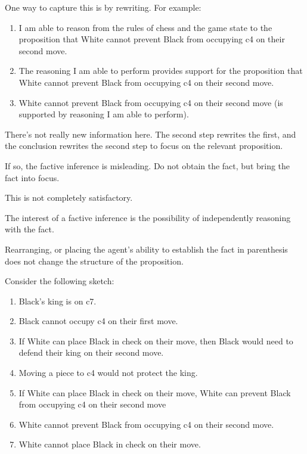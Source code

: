 \documentclass[10pt]{article}
\begin{document}
One way to capture this is by rewriting.
For example:

\begin{enumerate}
\item\label{potential:claim} I am able to reason from the rules of chess and the game state to the proposition that White cannot prevent Black from occupying c4 on their second move.
\item\label{potential:necessity} The reasoning I am able to perform provides support for the proposition that White cannot prevent Black from occupying c4 on their second move.
\item\label{potential:focus} White cannot prevent Black from occupying c4 on their second move (is supported by reasoning I am able to perform).
\end{enumerate}

There's not really new information here.
The second step rewrites the first, and the conclusion rewrites the second step to focus on the relevant proposition.

If so, the factive inference is misleading.
Do not obtain the fact, but bring the fact into focus.

This is not completely satisfactory.

The interest of a factive inference is the possibility of independently reasoning with the fact.

Rearranging, or placing the agent's ability to establish the fact in parenthesis does not change the structure of the proposition.

Consider the following sketch:

\begin{enumerate}
\item Black's king is on c7.
\item Black cannot occupy c4 on their first move.
\item If White can place Black in check on their move, then Black would need to defend their king on their second move.
\item Moving a piece to c4 would not protect the king.
\item\label{sketch:MTCond} If White can place Black in check on their move, White can prevent Black from occupying c4 on their second move
\item\label{sketch:factive:premise} White cannot prevent Black from occupying c4 on their second move.
\item\label{sketch:conclusion} White cannot place Black in check on their move.
\end{enumerate}
\end{document}
